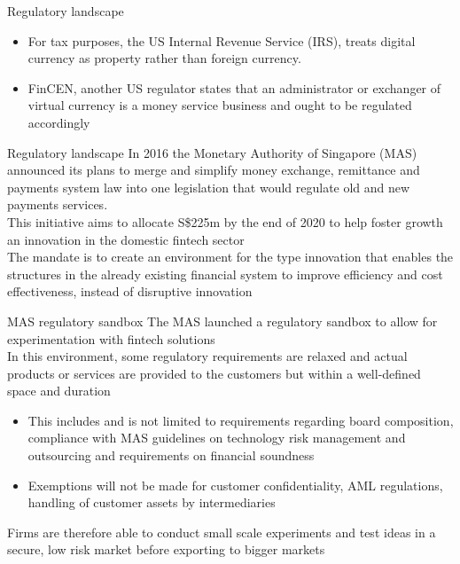 \documentclass[9pt]{beamer}
\begin{document}

\begin{frame}{Regulatory landscape}
	\begin{itemize}
		\item For tax purposes, the US Internal Revenue Service (IRS), treats digital currency as property rather than foreign currency.
		\item FinCEN, another US regulator states that an administrator or exchanger of virtual currency is a money service business and ought to be regulated accordingly
	\end{itemize}
\end{frame}


\begin{frame}{Regulatory landscape}
	In 2016 the Monetary Authority of Singapore (MAS) announced its plans to merge and simplify money exchange, remittance and payments system law into one legislation that would regulate old and new payments services. \\ \vspace{3mm}
	This initiative aims to allocate S\$225m by the end of 2020 to help foster growth an innovation in the domestic fintech sector\\ \vspace{3mm}
	The mandate is to create an environment for the type innovation that enables the structures in the already existing financial system to improve efficiency and cost effectiveness, instead of disruptive innovation
\end{frame}


\begin{frame}{MAS regulatory sandbox}
	The MAS launched a regulatory sandbox to allow for experimentation with fintech solutions \\ \vspace{3mm}
	In this environment, some regulatory requirements are relaxed and actual products or services are provided to the customers but within a well-defined space and duration
	\begin{itemize}
		\item This includes and is not limited to requirements regarding board composition, compliance with MAS guidelines on technology risk management and outsourcing and requirements on financial soundness
		\item Exemptions will not be made for customer confidentiality, AML regulations, handling of customer assets by intermediaries
	\end{itemize}
	Firms are therefore able to conduct small scale experiments and test ideas in a secure, low risk market before exporting to bigger markets
\end{frame}
\end{document}

